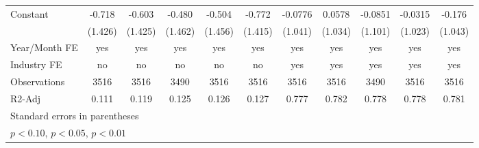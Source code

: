 \begin{table}[htbp]
\begin{tabular}{l*{10}{c}}
Constant        &   -0.718         &   -0.603         &   -0.480         &   -0.504         &   -0.772         &  -0.0776         &   0.0578         &  -0.0851         &  -0.0315         &   -0.176         \\
                &  (1.426)         &  (1.425)         &  (1.462)         &  (1.456)         &  (1.415)         &  (1.041)         &  (1.034)         &  (1.101)         &  (1.023)         &  (1.043)         \\
\hline
Year/Month FE   &      yes         &      yes         &      yes         &      yes         &      yes         &      yes         &      yes         &      yes         &      yes         &      yes         \\
Industry FE     &       no         &       no         &       no         &       no         &       no         &      yes         &      yes         &      yes         &      yes         &      yes         \\
Observations    &     3516         &     3516         &     3490         &     3516         &     3516         &     3516         &     3516         &     3490         &     3516         &     3516         \\
R2-Adj          &    0.111         &    0.119         &    0.125         &    0.126         &    0.127         &    0.777         &    0.782         &    0.778         &    0.778         &    0.781         \\
\hline\hline
\multicolumn{11}{l}{\footnotesize Standard errors in parentheses}\\
\multicolumn{11}{l}{\footnotesize \sym{*} \(p<0.10\), \sym{**} \(p<0.05\), \sym{***} \(p<0.01\)}\\
\end{tabular}
\end{table}
